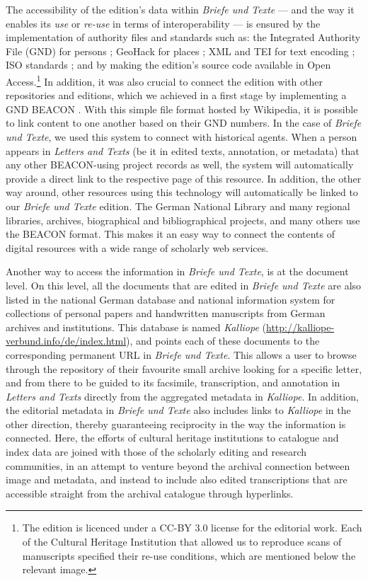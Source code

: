 \begin{paper}
The accessibility of the edition's data within \emph{Briefe und Texte} ---
and the way it enables its \emph{use} or \emph{re-use} in terms of interoperability --- is ensured by the
implementation of authority files and standards such as: the Integrated Authority
File (GND) for persons \citep{deutsche_national_bibliothek_integrated_2016}; GeoHack for
places \citep{mediawiki_geohack_2020}; XML and TEI for text encoding \citep{consortium_tei_2020}; ISO standards \citep{iso_standards_nodate};
and by making the edition's source code available in Open
Access.\footnote{The edition is licenced under a CC-BY 3.0 license for the editorial work. Each
  of the Cultural Heritage Institution that allowed us to reproduce scans
  of manuscripts specified their re-use conditions, which are mentioned
  below the relevant image.} In addition, it was also crucial to connect the edition with other
repositories and editions, which we achieved in a first stage by
implementing a GND BEACON \citep{wikipedia_wikipediabeacon_2020}. With this simple file format hosted by Wikipedia, it
is possible to link content to one another based on their GND numbers. 
In the case of \emph{Briefe und Texte}, we used this system to connect with historical
agents. When a person appears in \emph{Letters and Texts} (be it in
edited texts, annotation, or metadata) that any other BEACON-using project records as well, 
the system will automatically provide a direct link to the
respective page of this resource. In addition, the other way around,
other resources using this technology will automatically be linked to our \emph{Briefe und
Texte} edition. The German National Library and many regional libraries,
archives, biographical and bibliographical projects, and many others use
the BEACON format. This makes it an easy way to connect the
contents of digital resources with a wide range of scholarly web
services.

Another way to access the information in \emph{Briefe und
Texte}, is at the document level. On this level, all the documents that are edited in \emph{Briefe und
Texte} are also listed in the national German
database and national information system for collections of personal
papers and handwritten manuscripts from German archives and
institutions. This database is named \emph{Kalliope} (\url{http://kalliope-verbund.info/de/index.html}), and points each of these documents
to the corresponding permanent URL in \emph{Briefe und Texte}. This allows a user
to browse through the repository of their favourite small archive
looking for a specific letter, and from there to be guided to its facsimile,
transcription, and annotation in \emph{Letters and Texts} directly from the
aggregated metadata in \emph{Kalliope}. In addition, the
editorial metadata in \emph{Briefe und Texte} also includes links to
\emph{Kalliope} in the other direction, thereby guaranteeing reciprocity in
the way the information is connected. Here, the efforts of cultural heritage institutions 
to catalogue and index data are joined with those of the scholarly editing and research communities, 
in an attempt to venture beyond the archival connection between image and metadata, and instead to include 
also edited transcriptions that are accessible straight from the archival catalogue through hyperlinks.


\end{paper}
